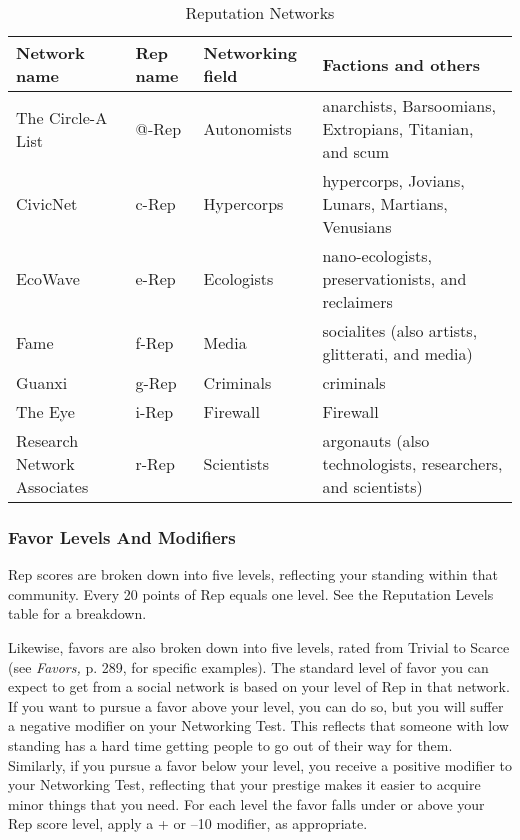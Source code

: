 \begin{table}
\caption{Reputation Networks}
\begin{tabularx}{\textwidth}{|X|l|l|X|}
\hline
Network name & Rep name & Networking field & Factions and others \\
\hline
The Circle-A List & @-Rep & Autonomists & anarchists, Barsoomians, Extropians, Titanian, and scum \\
\hline
CivicNet & c-Rep & Hypercorps & hypercorps, Jovians, Lunars, Martians, Venusians \\
\hline
EcoWave & e-Rep & Ecologists & nano-ecologists, preservationists, and reclaimers \\
\hline
Fame & f-Rep & Media & socialites (also artists, glitterati, and media) \\
\hline
Guanxi & g-Rep & Criminals & criminals \\
\hline
The Eye & i-Rep & Firewall & Firewall \\
\hline
Research Network Associates & r-Rep & Scientists & argonauts (also technologists, researchers, and scientists) \\
\hline
\end{tabularx}
\end{table}

\subsubsection{Favor Levels And Modifiers}

Rep scores are broken down into five levels, reflecting 
your standing within that community. Every 20 points 
of Rep equals one level. See the Reputation Levels 
table for a breakdown.

Likewise, favors are also broken down into five 
levels, rated from Trivial to Scarce (see \textit{Favors,} p. 289, 
for specific examples). The standard level of favor 
you can expect to get from a social network is based 
on your level of Rep in that network. If you want to 
pursue a favor above your level, you can do so, but 
you will suffer a negative modifier on your Networking
Test. This reflects that someone with low standing
has a hard time getting people to go out of their way 
for them. Similarly, if you pursue a favor below your 
level, you receive a positive modifier to your Networking
Test, reflecting that your prestige makes it easier to
acquire minor things that you need. For each level the 
favor falls under or above your Rep score level, apply 
a + or –10 modifier, as appropriate.

